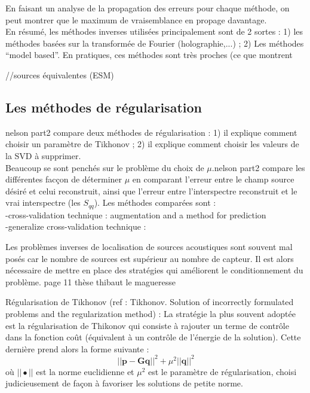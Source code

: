 En faisant un analyse de la propagation des erreurs pour chaque méthode, on peut montrer que le maximum de vraisemblance en propage davantage.\\

En résumé, les méthodes inverses utilisées principalement sont de 2 sortes : 1) les méthodes basées sur la transformée de Fourier (holographie,...) ; 2) Les méthodes ``model based''. En pratiques, ces méthodes sont très proches (ce que montrent %





//sources équivalentes (ESM)

\subsection{Les méthodes de régularisation}
nelson part2 compare deux méthodes de régularisation : 1) il explique comment choisir un paramètre de Tikhonov ; 2) il explique comment choisir les valeurs de la SVD à supprimer.\\ Beaucoup se sont penchés sur le problème du choix de $\mu$.nelson part2 compare les différentes facçon de déterminer $\mu$ en comparant l'erreur entre le champ source désiré et celui reconstruit, ainsi que l'erreur entre l'interspectre reconstruit et le vrai interspectre (les $S_{qq}$). Les méthodes comparées sont : \\
-cross-validation technique : %
augmentation and a method for prediction\\
-generalize cross-validation technique : %






Les problèmes inverses de localisation de sources acoustiques sont souvent mal posés car le nombre de sources est supérieur au nombre de capteur. Il est alors nécessaire de mettre en place des stratégies qui améliorent le conditionnement du problème. 
page 11 thèse thibaut le magueresse

Régularisation de Tikhonov (ref : Tikhonov. Solution of incorrectly formulated problems and the regularization method) : La stratégie la plus souvent adoptée est la régularisation de Thikonov qui consiste à rajouter un terme de contrôle dans la fonction coût (équivalent à un contrôle de l'énergie de la solution). Cette dernière prend alors la forme suivante : 
\begin{equation}
	||\bm{p}-\bm{G}\bm{q}||^2 + \mu^2||\bm{q}||^2
\end{equation}
où $||\bullet||$ est la norme euclidienne et $\mu^2$ est le paramètre de régularisation, choisi judicieusement de façon à favoriser les solutions de petite norme.

